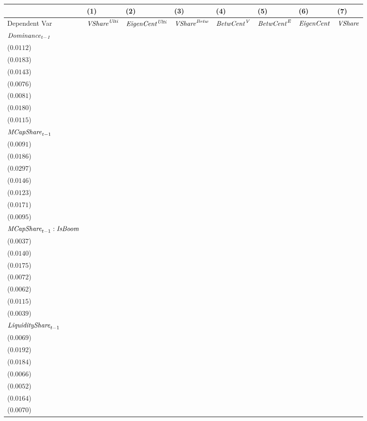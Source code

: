 \begin{tabular}{llllllll}
\toprule
 & (1) & (2) & (3) & (4) & (5) & (6) & (7) \\
\midrule
Dependent Var & ${\it {VShare}^{\it Ulti}}$ & ${\it EigenCent^{\it Ulti}}$ & ${\it VShare}^{\it Betw}$ & ${\it BetwCent}^{\it V}$ & ${\it BetwCent}^{\it E}$ & ${\it EigenCent}$ & ${\it VShare}$ \\
$\it Dominance_{t-1}$ & \makecell{$0.8441^{***}$ \\ ($0.0112$)} & \makecell{$0.7694^{***}$ \\ ($0.0183$)} & \makecell{$0.8601^{***}$ \\ ($0.0143$)} & \makecell{$0.9423^{***}$ \\ ($0.0076$)} & \makecell{$0.9429^{***}$ \\ ($0.0081$)} & \makecell{$0.7732^{***}$ \\ ($0.0180$)} & \makecell{$0.8443^{***}$ \\ ($0.0115$)} \\
${\it MCapShare}_{t-1}$ & \makecell{$0.0267^{***}$ \\ ($0.0091$)} & \makecell{$0.0330^{*}$ \\ ($0.0186$)} & \makecell{$0.0055^{}$ \\ ($0.0297$)} & \makecell{$0.0304^{**}$ \\ ($0.0146$)} & \makecell{$0.0354^{***}$ \\ ($0.0123$)} & \makecell{$0.0122^{}$ \\ ($0.0171$)} & \makecell{$0.0200^{**}$ \\ ($0.0095$)} \\
${\it MCapShare}_{t-1}:{\it IsBoom}$ & \makecell{$0.0048^{}$ \\ ($0.0037$)} & \makecell{$-0.0100^{}$ \\ ($0.0140$)} & \makecell{$0.0622^{***}$ \\ ($0.0175$)} & \makecell{$0.0197^{***}$ \\ ($0.0072$)} & \makecell{$0.0092^{}$ \\ ($0.0062$)} & \makecell{$0.0000^{}$ \\ ($0.0115$)} & \makecell{$0.0121^{***}$ \\ ($0.0039$)} \\
${\it LiquidityShare}_{t-1}$ & \makecell{$0.0367^{***}$ \\ ($0.0069$)} & \makecell{$0.0421^{**}$ \\ ($0.0192$)} & \makecell{$0.1181^{***}$ \\ ($0.0184$)} & \makecell{$0.0209^{***}$ \\ ($0.0066$)} & \makecell{$0.0182^{***}$ \\ ($0.0052$)} & \makecell{$0.0362^{**}$ \\ ($0.0164$)} & \makecell{$0.0443^{***}$ \\ ($0.0070$)} \\

\end{tabular}

